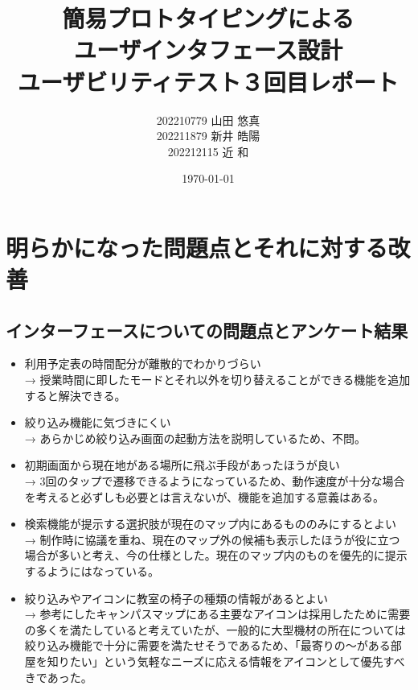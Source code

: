 \documentclass[12pt,a4paper,dvipdf]{jsarticle}
\title{簡易プロトタイピングによる\\ユーザインタフェース設計\\ユーザビリティテスト３回目レポート}
\author{202210779 山田 悠真\\202211879 新井 皓陽\\202212115 近 和}
\date{\today}
\begin{document}
\maketitle
\newpage
\section{明らかになった問題点とそれに対する改善}
\subsection{インターフェースについての問題点とアンケート結果}
\begin{itemize}
      \item 利用予定表の時間配分が離散的でわかりづらい\\
            → 授業時間に即したモードとそれ以外を切り替えることができる機能を追加すると解決できる。
      \item 絞り込み機能に気づきにくい\\
            → あらかじめ絞り込み画面の起動方法を説明しているため、不問。
      \item 初期画面から現在地がある場所に飛ぶ手段があったほうが良い\\
            → 3回のタップで遷移できるようになっているため、動作速度が十分な場合を考えると必ずしも必要とは言えないが、機能を追加する意義はある。
      \item 検索機能が提示する選択肢が現在のマップ内にあるもののみにするとよい\\
            → 制作時に協議を重ね、現在のマップ外の候補も表示したほうが役に立つ場合が多いと考え、今の仕様とした。現在のマップ内のものを優先的に提示するようにはなっている。
      \item 絞り込みやアイコンに教室の椅子の種類の情報があるとよい\\
            → 参考にしたキャンパスマップにある主要なアイコンは採用したために需要の多くを満たしていると考えていたが、一般的に大型機材の所在については絞り込み機能で十分に需要を満たせそうであるため、「最寄りの～がある部屋を知りたい」という気軽なニーズに応える情報をアイコンとして優先すべきであった。
\end{itemize}
\end{document}
